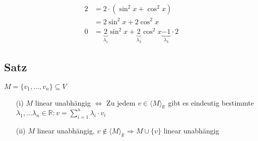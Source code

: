\documentclass[12pt,titlepage, pdf]{article}
\newcommand{\R}{\mathds{R}}
\newcommand{\vecspace}[2]{\langle#1\rangle_{#2}}
\newcommand{\vecspaceR}[1]{\vecspace{#1}{\R}}
\renewcommand{\>}{\rightarrow}
\renewcommand{\*}{\cdot}
\begin{document}
\begin{itemize}
\begin{itemize}
	      	      \begin{align*}
	      	      	2 & =2\*(\sin^2x+\cos^2x)                                                                              \\
	      	      	  & =2\sin^2x+2\cos^2x                                                                                 \\
	      	      	0 & =\underbrace{2}_{\lambda_1}\sin^2x+\underbrace{2}_{\lambda_2}\cos^2x\underbrace{-1}_{\lambda_3}\*2 
	      	      \end{align*}
	      \end{itemize}
\end{itemize}
\subsection{Satz}
\label{1.16}
$M = \{v_1,...,v_n \} \subseteq V$\\
\begin{itemize}
	\item[(i)] $M$ linear unabhängig $\Leftrightarrow  \text{ Zu jedem } v \in \vecspaceR{M}$ gibt es eindeutig bestimmte \\
	      \noindent\hspace*{43mm}$\lambda_1, ... \lambda_n  \in \R:v = \sum_{i= 1}^{n} \lambda_i \cdot v_i$
	\item[(ii)] $M$ linear unabhängig, $v \notin \vecspaceR{M} \Rightarrow M \cup \{ v \} $ linear unabhängig 
\end{itemize}
\end{document}
